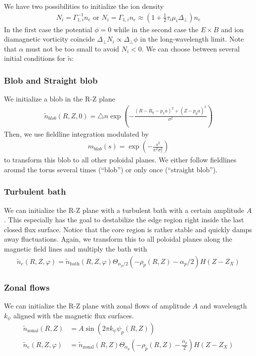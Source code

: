 We have two possibilities to initialize the ion density
\begin{align} \label{eq:initphi}
  N_i = \Gamma_{1,i}^{-1} n_e \text{ or } N_i = \Gamma_{1,i}n_e\approx \left(1+\frac{1}{2}\tau_i\mu_i\Delta_\perp\right)n_e
\end{align}
In the first case the potential $\phi= 0$ while in the second case
the $E\times B$ and ion diamagnetic vorticity coincide $\Delta_\perp N_i \propto \Delta_\perp \phi$ in the long-wavelength limit.
Note that $\alpha$ must not be too small to avoid $N_i < 0$.
We can choose between several initial conditions for $\tilde n$:

\subsubsection{Blob and Straight blob}
We initialize a blob in the R-Z plane
\begin{align} \label{eq:initial_blob}
  \tilde n_{blob}(R,Z,0) = \triangle n \exp\left( -\frac{(R - R_0 - p_x a)^2 + (Z-p_ya)^2}{\sigma^2} \right)
\end{align}
Then, we use fieldline integration modulated by
\begin{align}
  m_{blob}(s) = \exp\left( -\frac{s^2 }{\pi^2\sigma_z^2} \right)
\end{align}
to transform this blob to all other poloidal
planes.
We either follow fieldlines around the torus several times (``blob'') or only once
(``straight blob'').
\subsubsection{Turbulent bath}
We can initialize the R-Z plane with a turbulent bath with a certain amplitude $A$.
This especially has the goal to destabilize the edge region right inside the
last closed flux surface. Notice that the core region is rather stable
and quickly damps away fluctuations.
Again, we transform this to all poloidal planes along the magnetic field lines and multiply the bath with
\begin{align} \label{eq:initial_turbulent}
    \tilde n_e(R,Z,\varphi) = \tilde n_{\text{bath}}(R,Z,\varphi)\Theta_{\alpha_p/2}(-\rho_p(R, Z)-\alpha_p/2) H(Z-Z_X)
\end{align}
\subsubsection{Zonal flows}
We can initialize the R-Z plane with zonal flows of amplitude $A$ and
wavelength $k_\psi$ aligned with the magnetic flux surfaces.
\begin{align} \label{eq:initial_zonal_flow}
    \tilde n_{\text{zonal}}(R,Z) &= A \sin (2\pi k_\psi \psi_p(R,Z)) \nonumber\\
\tilde n_e(R,Z,\varphi) &= \tilde n_{\text{zonal}}(R,Z)\Theta_{\alpha_p}\left(-\rho_p(R, Z)-\frac{\alpha_p}{2}\right) H(Z-Z_X)
\end{align}
